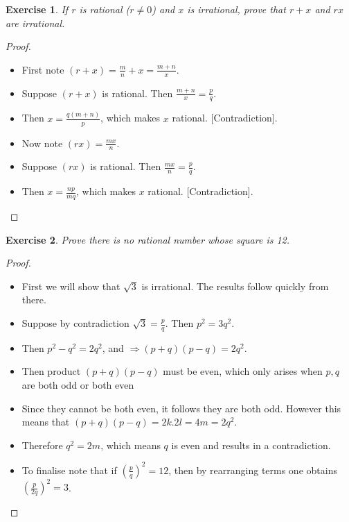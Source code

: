 \documentclass[12pt]{article}
\newtheorem{exercise}{Exercise}[section]
\begin{document}
\begin{exercise}
    If $r$ is rational ($r \neq 0$) and $x$ is irrational, prove that $r+x$ and $rx$ are irrational.
\end{exercise}

\begin{proof}

    \begin{itemize}
        \item First note $(r+x) = \frac{m}{n} + x = \frac{m+n}{x}$.
        \item Suppose $(r+x)$ is rational. Then $\frac{m+n}{x} = \frac{p}{q}$.
        \item Then $x = \frac{q(m+n)}{p}$, which makes $x$ rational. [Contradiction].
        \item Now note $(rx) = \frac{mx}{n}$.
        \item Suppose $(rx)$ is rational. Then $\frac{mx}{n} = \frac{p}{q}$.
        \item Then $x = \frac{np}{mq}$, which makes $x$ rational. [Contradiction].
    \end{itemize}

\end{proof}

\begin{exercise}
    Prove there is no rational number whose square is 12.
\end{exercise}

\begin{proof}

    \begin{itemize}
        \item First we will show that $\sqrt{3}$ is irrational. The results follow quickly from there.
        \item Suppose by contradiction $\sqrt{3} = \frac{p}{q}$. Then $p^2 = 3q^2$.
        \item Then $p^2 - q^2 = 2q^2$, and $\Rightarrow (p+q)(p-q) = 2q^2$.
        \item Then product $(p+q)(p-q)$ must be even, which only arises when $p, q$ are both odd or both even
        \item Since they cannot be both even, it follows they are both odd. However this means that $(p+q)(p-q) = 2k.2l = 4m = 2q^2$.
        \item Therefore $q^2 = 2m$, which means $q$ is even and results in a contradiction.
        \item To finalise note that if $(\frac{p}{q})^2 = 12$, then by rearranging terms one obtains $(\frac{p}{2q})^2 = 3$.
    \end{itemize}

\end{proof}
\end{document}
